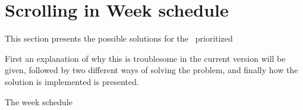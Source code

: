 \section{Scrolling in Week schedule}

This section presents the possible solutions for the \phigh~prioritized

First an explanation of why this is troublesome in the current version will be given, followed by two different ways of solving the problem, and finally how the solution is implemented is presented.

The week schedule

